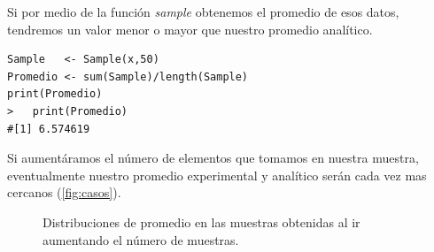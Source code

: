 \documentclass[]{article}
\begin{document}
Si por medio de la función \textit{sample} obtenemos el promedio de esos datos, tendremos un valor menor o mayor que nuestro promedio analítico.
  \begin{lstlisting}
Sample   <- Sample(x,50)
Promedio <- sum(Sample)/length(Sample)
print(Promedio)
>   print(Promedio)
#[1] 6.574619

   \end{lstlisting}
Si aumentáramos el número de elementos que tomamos en nuestra muestra, eventualmente nuestro promedio experimental y analítico serán cada vez mas cercanos (\autoref{fig:casos}).
\begin{figure}[hbt!]
\centering
{}%
\hfill
{}%
\hfill
{}%
\hfill
{}%
\hfill
\caption{Distribuciones de promedio en las muestras obtenidas al ir aumentando el número de muestras.}

\label{fig:casos}
\end{figure}   
\hfill
\printbibliography[title={Referencias}]
\end{document}
